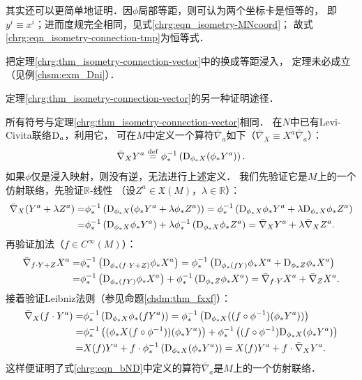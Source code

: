 \begin{remark}
    其实还可以更简单地证明．因$\phi$局部等距，则可认为两个坐标卡是恒等的，
    即$y^i\equiv x^i$；进而度规完全相同，见式\eqref{chrg:eqn_isometry-MNcoord}；
    故式\eqref{chrg:eqn_isometry-connection-tmp}为恒等式．
\end{remark}

\begin{remark}
    把定理\ref{chrg:thm_isometry-connection-vector}中的换成等距浸入，
    定理未必成立（见例\ref{chsm:exm_Dni}）．
\end{remark}

\begin{example}
	定理\ref{chrg:thm_isometry-connection-vector}的另一种证明途径．
\end{example}
所有符号与定理\ref{chrg:thm_isometry-connection-vector}相同．
在$N$中已有Levi-Civita联络${\rm D}_a$，利用它，
可在$M$中定义一个算符$\bar{\nabla}_a$如下（$\bar{\nabla}_X \equiv X^a\bar{\nabla}_a $）：
\begin{equation}\label{chrg:eqn_bND}
	\bar{\nabla}_X Y^a \overset{\mathrm {def}}{=} \phi^{-1}_* \left( {\rm D}_{\phi_* X} (\phi_*Y^a) \right).
\end{equation}
如果$\phi$仅是浸入映射，则没有逆，无法进行上述定义．
我们先验证它是$M$上的一个仿射联络，先验证$\mathbb{R}$-线性
（设$Z^a \in \mathfrak{X}(M)$，$\lambda \in \mathbb{R}$）：
\begin{align*}
	\bar{\nabla}_X (Y^a + \lambda Z^a) =& \phi^{-1}_* \left( {\rm D}_{\phi_* X} (\phi_*Y^a +\lambda \phi_*Z^a)\right)
	= \phi^{-1}_* \left( {\rm D}_{\phi_* X}\phi_*Y^a +\lambda  {\rm D}_{\phi_* X} \phi_*Z^a\right)\\
	=& \phi^{-1}_* \left( {\rm D}_{\phi_* X}\phi_*Y^a\right) +\lambda  \phi^{-1}_* \left({\rm D}_{\phi_* X} \phi_*Z^a\right)
	=  \bar{\nabla}_X Y^a  + \lambda  \bar{\nabla}_X Z^a .
\end{align*}
再验证加法（$f\in C^\infty(M)$）：
\begin{align*}
	\bar{\nabla}_{f\cdot Y + Z} X^a =& \phi^{-1}_* \left( {\rm D}_{\phi_* (f\cdot Y+Z)} \phi_*X^a\right)
	=\phi^{-1}_* \left( {\rm D}_{\phi_* (f Y)} \phi_*X^a+ {\rm D}_{\phi_*Z} \phi_*X^a\right)\\
	=&\phi^{-1}_* \left( {\rm D}_{\phi_* (f Y)} \phi_*X^a\right)+\phi^{-1}_* \left( {\rm D}_{\phi_*Z} \phi_*X^a\right)
	=   \bar{\nabla}_{f\cdot Y } X^a  +\bar{\nabla}_{ Z} X^a .
\end{align*}
接着验证Leibniz法则（参见命题\ref{chdm:thm_fxxf}）：
\begin{align*}
	\bar{\nabla}_X (f\cdot Y^a ) =& \phi^{-1}_* \left( {\rm D}_{\phi_* X} \phi_* (fY^a) \right)
	= \phi^{-1}_* \left( {\rm D}_{\phi_* X} ((f\circ \phi^{-1})(\phi_* Y^a) )\right) \\
	=& \phi^{-1}_* \left(({\phi_* X} (f\circ \phi^{-1})) (\phi_* Y^a)\right) + 
	\phi^{-1}_* \left((f\circ \phi^{-1}) {\rm D}_{\phi_* X} (\phi_* Y^a )\right)  \\
	=& X(f) Y^a  +   f\cdot \phi^{-1}_* \left({\rm D}_{\phi_* X} (\phi_* Y^a )\right)  
	= X(f) Y^a  +   f\cdot \bar{\nabla}_X Y^a  . 
\end{align*}
这样便证明了式\eqref{chrg:eqn_bND}中定义的算符$\bar{\nabla}_a$是$M$上的一个仿射联络．

